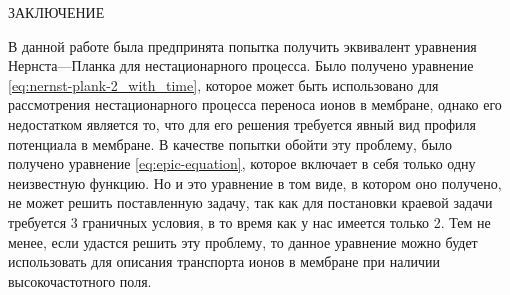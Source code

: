 \begin{center}
    ЗАКЛЮЧЕНИЕ
\end{center}
В данной работе была предпринята попытка получить эквивалент уравнения
Нернста—Планка для нестационарного процесса. Было получено уравнение
\eqref{eq:nernst-plank-2_with_time}, которое может быть использовано для рассмотрения
нестационарного процесса переноса ионов в мембране, однако его недостатком является то,
что для его решения требуется явный вид профиля потенциала в мембране.
В качестве попытки обойти эту проблему, было получено уравнение
\eqref{eq:epic-equation}, которое включает в себя только одну неизвестную функцию.
Но и это уравнение в том виде, в котором оно получено, не может решить
поставленную задачу, так как для постановки краевой задачи требуется 3
граничных условия, в то время как у нас имеется только 2. Тем не менее,
если удастся решить эту проблему, то данное уравнение можно будет
использовать для описания транспорта ионов в мембране при наличии
высокочастотного поля.
